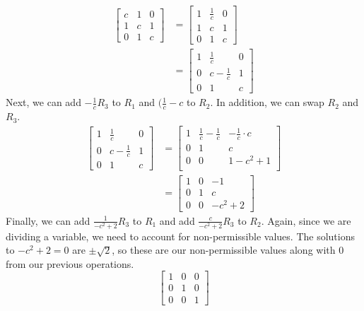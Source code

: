 \documentclass[11pt, letterpaper, twoside]{article}
\begin{document}
\begin{enumerate}
\begin{enumerate}[label=(\alph*)]
\begin{align*}
\begin{bmatrix}
c & 1 & 0\\
1 & c & 1\\
0 & 1 & c
\end{bmatrix}&=\begin{bmatrix}
1 & \frac{1}{c} & 0\\
1 & c & 1\\
0 & 1 & c
\end{bmatrix}\\
&=\begin{bmatrix}
1 & \frac{1}{c} & 0\\
0 & c-\frac{1}{c} & 1\\
0 & 1 & c
\end{bmatrix}
\end{align*}
Next, we can add $-\frac{1}{c} R_3$ to $R_1$ and $(\frac{1}{c}-c$ to $R_2$. In addition, we can swap $R_2$ and $R_3$.
\begin{align*}
\begin{bmatrix}
1 & \frac{1}{c} & 0\\
0 & c-\frac{1}{c} & 1\\
0 & 1 & c
\end{bmatrix}&=\begin{bmatrix}
1 & \frac{1}{c}-\frac{1}{c} & -\frac{1}{c}\cdot c\\
0 & 1 & c\\
0 & 0 & 1-c^2+1\\
\end{bmatrix}\\
&=\begin{bmatrix}
1 & 0 & -1\\
0 & 1 & c\\
0 & 0 & -c^2+2
\end{bmatrix}
\end{align*}
Finally, we can add $ \frac{1}{-c^2+2}R_3$ to $R_1$ and add $\frac{c}{-c^2+2}R_3$ to $R_2$. Again, since we are dividing a variable, we need to account for non-permissible values. The solutions to $-c^2+2=0$ are $\pm \sqrt{2}$, so these are our non-permissible values along with $0$ from our previous operations.
$$ \begin{bmatrix}
1 & 0 & 0\\
0 & 1 & 0\\
0 & 0 & 1
\end{bmatrix}$$


\end{enumerate}
\end{enumerate}
\end{document}
